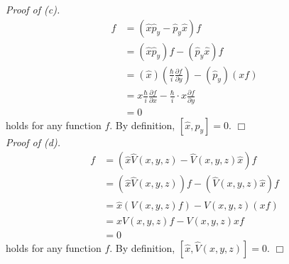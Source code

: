 \documentclass{article}
\begin{document}
\emph{Proof of (c).}
\begin{align*}
[\hat{x}, \hat{p}_y]f
&= (\hat{x}\hat{p}_y - \hat{p}_y \hat{x})f \\
&= (\hat{x}\hat{p}_y)f - (\hat{p}_y \hat{x})f \\
&= (\hat{x})\left( \frac{\hbar}{i}\frac{\partial f}{\partial y} \right)
  - (\hat{p}_y)(xf) \\
&= x \frac{\hbar}{i}\frac{\partial f}{\partial x}
  - \frac{\hbar}{i} \cdot x \frac{\partial f}{\partial y} \\
&= 0
\end{align*}
holds for any function $f$.
By definition,
$[\hat{x}, \hat{p}_y] = 0$.
$\Box$ \\

\emph{Proof of (d).}
\begin{align*}
[\hat{x}, \hat{V}(x,y,z)]f
&= (\hat{x}\hat{V}(x,y,z) - \hat{V}(x,y,z) \hat{x})f \\
&= (\hat{x}\hat{V}(x,y,z))f - (\hat{V}(x,y,z) \hat{x})f \\
&= \hat{x}(V(x,y,z)f) - \hat{V}(x,y,z)(xf) \\
&= x V(x,y,z)f - V(x,y,z) xf \\
&= 0
\end{align*}
holds for any function $f$.
By definition,
$[\hat{x}, \hat{V}(x,y,z)] = 0$.
$\Box$ \\





\end{document}
